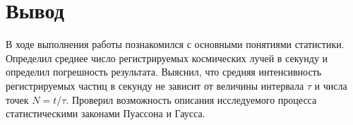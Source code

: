 \documentclass[a4paper, 12pt]{article}
\begin{document}
\section*{Вывод}
В ходе выполнения работы познакомился с основными понятиями статистики. Определил среднее число регистрируемых космических лучей в секунду и определил погрешность результата. Выяснил, что средняя интенсивность регистрируемых частиц в секунду не зависит от величины интервала $\tau$ и числа точек $N = t / \tau$. Проверил возможность описания исследуемого процесса статистическими законами Пуассона и Гаусса.
\end{document}
